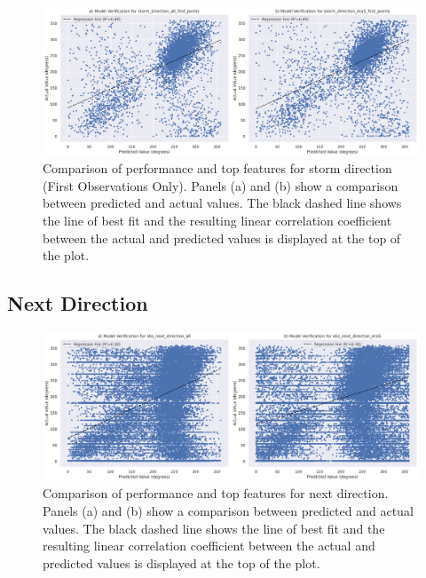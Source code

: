 \begin{figure}[ht]
    \centering
    \includegraphics[width=\textwidth]{../figures/generated/experiments/storm_direction_first_points/storm_direction_first_points_summary.png}
    \caption{Comparison of performance and top features for storm direction (First Observations Only). Panels (a) and (b) show a comparison between predicted and actual values. The black dashed line shows the line of best fit and the resulting linear correlation coefficient between the actual and predicted values is displayed at the top of the plot.}
    \label{fig:storm_direction_first_points_summary}
\end{figure}

\subsection{Next Direction}

\begin{figure}[ht]
    \centering
    \includegraphics[width=\textwidth]{../figures/generated/experiments/obs_next_direction/obs_next_direction_summary.png}
    \caption{Comparison of performance and top features for next direction. Panels (a) and (b) show a comparison between predicted and actual values. The black dashed line shows the line of best fit and the resulting linear correlation coefficient between the actual and predicted values is displayed at the top of the plot.}
    \label{fig:obs_direction_summary}
\end{figure}

